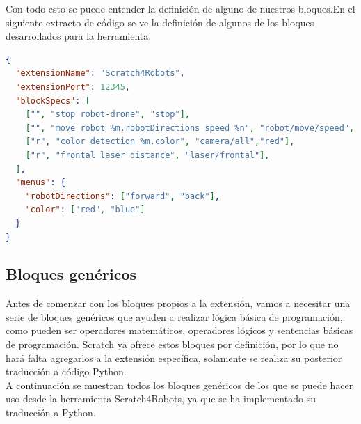 Con todo esto se puede entender la definición de alguno de nuestros bloques.En el siguiente extracto de código se ve la definición de algunos de los bloques desarrollados para la herramienta.
\begin{nobreak} 
\begin{lstlisting}[language=json,firstnumber=1]
{
  "extensionName": "Scratch4Robots",
  "extensionPort": 12345, 
  "blockSpecs": [
    ["", "stop robot-drone", "stop"],         
    ["", "move robot %m.robotDirections speed %n", "robot/move/speed", "forward", 1],
    ["r", "color detection %m.color", "camera/all","red"],
    ["r", "frontal laser distance", "laser/frontal"],
  ],
  "menus": {
    "robotDirections": ["forward", "back"],         
    "color": ["red", "blue"]
  }
}

\end{lstlisting}
\end{nobreak} 

\subsection{Bloques genéricos}
Antes de comenzar con los bloques propios a la extensión, vamos a necesitar una serie de bloques genéricos que ayuden a realizar lógica básica de programación, como pueden ser operadores matemáticos, operadores lógicos y sentencias básicas de programación. Scratch ya ofrece estos bloques por definición, por lo que no hará falta agregarlos a la extensión específica, solamente se realiza su posterior traducción a código Python.\\

A continuación se muestran todos los bloques genéricos de los que se puede hacer uso desde la herramienta Scratch4Robots, ya que se ha implementado su traducción a Python.

